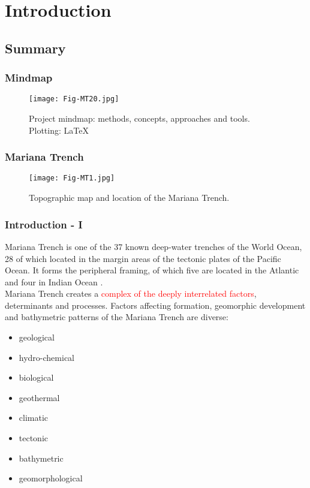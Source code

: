 \documentclass[pdflatex,compress,8pt,
	xcolor={dvipsnames,dvipsnames,svgnames,x11names,table},
	hyperref={colorlinks = true,breaklinks = true, urlcolor = NavyBlue, breaklinks = true}]{beamer}
\begin{document}
\section{Introduction}
\subsection{Summary}

\begin{frame}\frametitle{Mindmap}
\vspace{1em}
\begin{figure}[H]
	\centering
		\texttt{[image: Fig-MT20.jpg]}
	\caption{Project mindmap: methods, concepts, approaches and tools. \\Plotting: \LaTeX \space \cite{Lemenkova201993}}\label{fig:MT20}
\end{figure}
\end{frame}

\begin{frame}\frametitle{Mariana Trench}
\vspace{1em}
\begin{figure}[H]
	\centering
		\texttt{[image: Fig-MT1.jpg]}
	\caption{Topographic map and location of the Mariana Trench. \cite{Lemenkova201992}}\label{fig:MT1}
\end{figure}
\end{frame}

\begin{frame}\frametitle{Introduction - I}
Mariana Trench is one of the 37 known deep-water trenches of the World Ocean, 28 of which located in the margin areas of the tectonic plates of the Pacific Ocean. It forms the peripheral framing, of which five are located in the Atlantic \cite{Bogdanov1997} and four in Indian Ocean \cite{Lisicynetal1990}.\\ Mariana Trench creates a \textcolor{red}{complex of the deeply interrelated factors}, determinants and processes. Factors affecting formation, geomorphic development and bathymetric patterns of the Mariana Trench are diverse:\\
\begin{itemize}
            \item geological 
            \item hydro-chemical
            \item biological
            \item geothermal
            \item climatic
            \item tectonic
            \item bathymetric 
            \item geomorphological
  \end{itemize} 
\end{frame}
\end{document}
